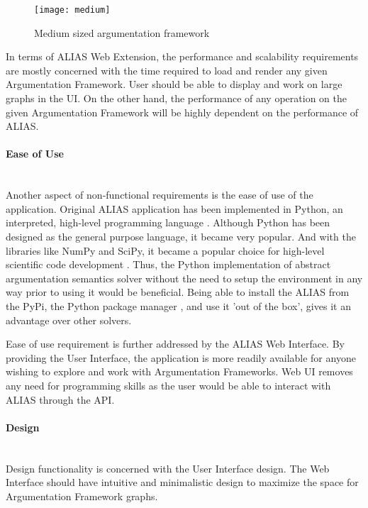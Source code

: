 \begin{figure}[h]
	\texttt{[image: medium]}
	\caption{Medium sized argumentation framework}
	\label{fig:mediumAF}
\end{figure}

In terms of ALIAS Web Extension, the performance and scalability requirements are mostly concerned with the time required to load and render any given Argumentation Framework. User should be able to display and work on large graphs in the UI. On the other hand, the performance of any operation on the given Argumentation Framework will be highly dependent on the performance of ALIAS.

\paragraph{Ease of Use} \mbox{}\\

Another aspect of non-functional requirements is the ease of use of the application. Original ALIAS application has been implemented in Python, an interpreted, high-level programming language \citep{millman2011python}. Although Python has been designed as the general purpose language, it became very popular. And with the libraries like NumPy and SciPy, it became a popular choice for high-level scientific code development \citep{perez2011python}. Thus, the Python implementation of abstract argumentation semantics solver without the need to setup the environment in any way prior to using it would be beneficial. Being able to install the ALIAS from the PyPi, the Python package manager \citep{pypi}, and use it 'out of the box', gives it an advantage over other solvers.

Ease of use requirement is further addressed by the ALIAS Web Interface. By providing the User Interface, the application is more readily available for anyone wishing to explore and work with Argumentation Frameworks. Web UI removes any need for programming skills as the user would be able to interact with ALIAS through the API.

\paragraph{Design} \mbox{} \\
Design functionality is concerned with the User Interface design. The Web Interface should have intuitive and minimalistic design to maximize the space for Argumentation Framework graphs. 